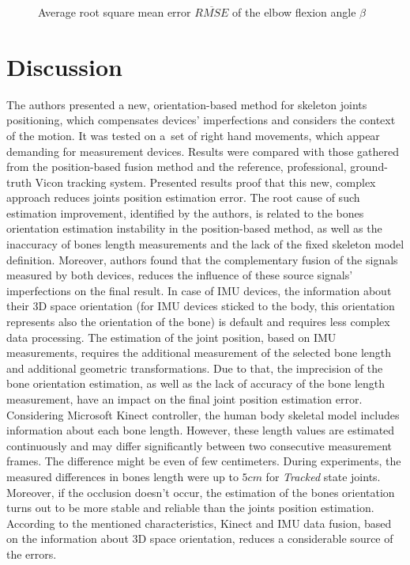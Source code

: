 \documentclass[sensors,article,submit,moreauthors,pdftex,10pt,a4paper]{mdpi}
\begin{document}
\begin{figure}[H] %
	\centering
	
	\caption{Average root square mean error $\overline{RMSE}$ of the elbow flexion angle $\beta$}
	\label{fig:results:elbowAngleError}
\end{figure}
		
\section{Discussion}
		
The authors presented a new, orientation-based method for skeleton joints positioning, which compensates devices' imperfections and considers the context of the motion. It was tested on a~set of right hand movements, which appear demanding for measurement devices. Results were compared with those gathered from the position-based fusion method and the reference, professional, ground-truth Vicon tracking system. Presented results proof that this new, complex approach reduces joints position estimation error. The root cause of such estimation improvement, identified by the authors, is related to the bones orientation estimation instability in the position-based method, as well as the inaccuracy of bones length measurements and the lack of the fixed skeleton model definition. Moreover, authors found that the complementary fusion of the signals measured by both devices, reduces the influence of these source signals' imperfections on the final result.
In case of IMU devices, the information about their 3D space orientation (for IMU devices sticked to the body, this orientation represents also the orientation of the bone) is default and requires less complex data processing. The estimation of the joint position, based on IMU measurements, requires the additional measurement of the selected bone length and additional geometric transformations. Due to that, the imprecision of the bone orientation estimation, as well as the lack of accuracy of the bone length measurement, have an impact on the final joint position estimation error.
Considering Microsoft Kinect controller, the human body skeletal model includes information about each bone length. However, these length values are estimated continuously and may differ significantly between two consecutive measurement frames. The difference might be even of few centimeters. During experiments, the measured differences in bones length were up to $5cm$ for \emph{Tracked} state joints.  Moreover, if the occlusion doesn't occur, the estimation of the bones orientation turns out to be more stable and reliable than the joints position estimation. 
According to the mentioned characteristics, Kinect and IMU data fusion, based on the information about 3D space orientation, reduces a considerable source of the errors.
\end{document}
